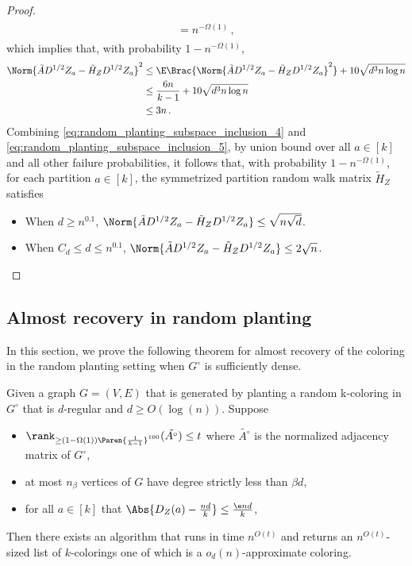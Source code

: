 \begin{proof}
\begin{align}
\begin{split}
        = n^{- \Omega(1)} \,,
    \end{split}
    \end{align}
    which implies that, with probability $1 - n^{- \Omega(1)}$,
    \begin{align*}
        \Norm{\tilde{A} D^{1/2} Z_a - \tilde{H}_Z D^{1/2} Z_a}^2
        & \leq \E \Brac{\Norm{\tilde{A} D^{1/2} Z_a - \tilde{H}_Z D^{1/2} Z_a}^2} + 10 \sqrt{d^3 n \log n} \\
        & \leq \frac{6 n}{k-1} + 10 \sqrt{d^3 n \log n} \\
        & \leq 3 n\,.
    \end{align*}
    Combining \cref{eq:random_planting_subspace_inclusion_4} and \cref{eq:random_planting_subspace_inclusion_5}, by union bound over all $a \in [k]$ and all other failure probabilities, it follows that, with probability $1-n^{-\Omega(1)}$, for each partition $a \in [k]$, the symmetrized partition random walk matrix $\tilde{H}_Z$ satisfies
    \begin{itemize}
        \item When $d \geq n^{0.1}$, $\Norm{\tilde{A} D^{1/2} Z_a - \tilde{H}_Z D^{1/2} Z_a} \leq \sqrt{n \sqrt{d}}$.
        \item When $C_d \leq d \leq n^{0.1}$, $\Norm{\tilde{A} D^{1/2} Z_a - \tilde{H}_Z D^{1/2} Z_a} \leq 2 \sqrt{n}$.
    \end{itemize}
\end{proof}

\subsection{Almost recovery in random planting}

In this section, we prove the following theorem for almost recovery of the coloring in the random planting setting when $G^{\circ}$ is sufficiently dense.

\begin{theorem}
\label{thm:rp_partial_recovery}
    Given a graph $G=(V, E)$ that is generated by planting a random k-coloring in $G^{\circ}$ that is $d$-regular and $d \geq O(\log(n))$. Suppose
    \begin{itemize}
        \item $\rank_{\geq (1-\Omega(1)) \Paren{\frac{1}{k-1}}^{100}}(\tilde{A^{\circ}}) \leq t$ where $\tilde{A^{\circ}}$ is the normalized adjacency matrix of $G^{\circ}$,
        \item at most $n_{\beta}$ vertices of $G$ have degree strictly less than $\beta d$,
        \item for all $a\in[k]$ that $\Abs{D_Z(a) - \frac{nd}{k}}\leq \frac{\e nd}{k}$,
    \end{itemize}
    Then there exists an algorithm that runs in time $n^{O(t)}$ and returns an $n^{O(t)}$-sized list of $k$-colorings one of which is a $o_d(n)$-approximate coloring.
\end{theorem}

